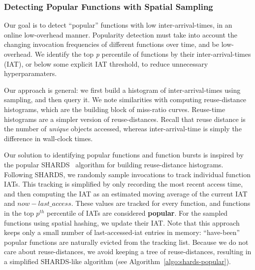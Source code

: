 \subsubsection{Detecting Popular Functions with Spatial Sampling}

Our goal is to detect ``popular'' functions with low inter-arrival-times, in an online low-overhead manner.
%
Popularity detection must take into account the changing invocation frequencies of different functions over time, and be low-overhead.
We identify the top \textit{p} percentile of functions by their inter-arrival-times (IAT), or below some explicit IAT threshold, to reduce unnecessary hyperparamaters. 

Our approach is general: we first build a histogram of inter-arrival-times using sampling, and then query it. 
We note similarities with computing reuse-distance histograms, which are the building block of miss-ratio curves. 
Reuse-time histograms are a simpler version of reuse-distances.
Recall that reuse distance is the number of \emph{unique} objects accessed, whereas inter-arrival-time is simply the difference in wall-clock times.



Our solution to identifying popular functions and function bursts is inspired by the popular SHARDS~\cite{shards} algorithm for building reuse-distance histograms. 
%
Following SHARDS, we randomly sample invocations to track individual function IATs. 
This tracking is simplified by only recording the most recent access time, and then computing the IAT as an estimated moving average of the current IAT and  $now - last\_access$. 
These values are tracked for every function, and functions in the top $p^{th}$ percentile of IATs are considered \textbf{popular}.
%
For the sampled functions using spatial hashing, we update their IAT.
Note that this approach keeps only a small number of last-accessed-iat entries in memory: ``have-been'' popular functions are naturally evicted from the tracking list. 
Because we do not care about reuse-distances, we avoid keeping a tree of reuse-distances, resulting in a simplified SHARDS-like algorithm (see Algorithm~\ref{algo:shards-popular}). 



